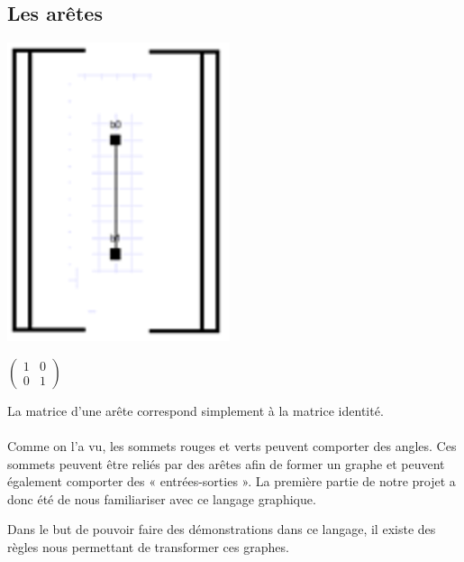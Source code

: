 \documentclass[a4paper,oneside]{book}
\begin{document}
\subsection{Les arêtes}
\begin{center}
\hspace{1cm}
\begin{minipage}[c]{0.25\textwidth}
\includegraphics[scale=0.9]{IMG/arete.eps}
\end{minipage}
\hspace{1.5cm}
\begin{minipage}[c]{0.25\textwidth}
$
\begin{pmatrix}
1 & 0 \\
0 & 1
\end{pmatrix}
$
\end{minipage}
\label{arete}
\end{center}

La matrice d'une arête correspond simplement à la matrice identité.

\vspace{1cm}
\paragraph*{}

Comme on l'a vu, les sommets rouges et verts peuvent comporter des angles. Ces sommets peuvent être reliés par des arêtes afin de former un graphe et peuvent également comporter des « entrées-sorties ». La première partie de notre projet a donc été de nous familiariser avec ce langage graphique.

Dans le but de pouvoir faire des démonstrations dans ce langage, il existe des règles nous permettant de transformer ces graphes.
\end{document}
